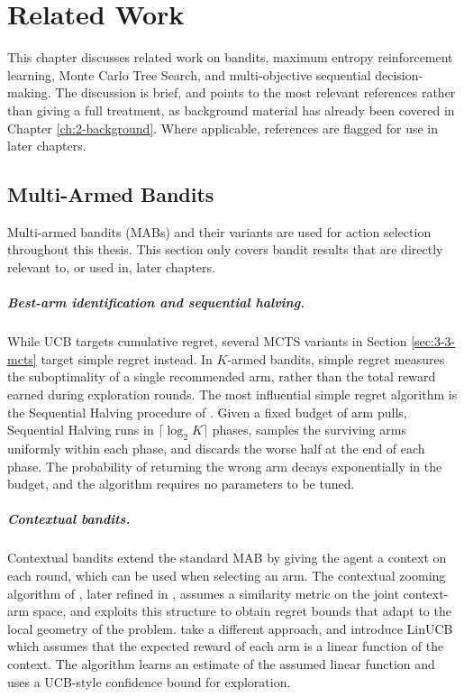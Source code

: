 



\chapter{\label{ch:3-relatedwork}Related Work}

    \minitoc

    This chapter discusses related work on bandits, maximum entropy reinforcement learning, Monte Carlo Tree Search, and multi-objective sequential decision-making. The discussion is brief, and points to the most relevant references rather than giving a full treatment, as background material has already been covered in Chapter \ref{ch:2-background}. Where applicable, references are flagged for use in later chapters.




\section{Multi-Armed Bandits}
\label{sec:3-1-mab}

    Multi-armed bandits (MABs) and their variants are used for action selection throughout this thesis. This section only covers bandit results that are directly relevant to, or used in, later chapters.

    \paragraph{Best-arm identification and sequential halving.}
    While UCB targets cumulative regret, several MCTS variants in Section \ref{sec:3-3-mcts} target simple regret instead. In $K$-armed bandits, simple regret measures the suboptimality of a single recommended arm, rather than the total reward earned during exploration rounds. The most influential simple regret algorithm is the Sequential Halving procedure of \citet{seq_halving}. Given a fixed budget of arm pulls, Sequential Halving runs in $\lceil \log_2 K \rceil$ phases, samples the surviving arms uniformly within each phase, and discards the worse half at the end of each phase. The probability of returning the wrong arm decays exponentially in the budget, and the algorithm requires no parameters to be tuned. 

    \paragraph{Contextual bandits.}
    Contextual bandits extend the standard MAB by giving the agent a context on each round, which can be used when selecting an arm. The contextual zooming algorithm of \citet{cz}, later refined in \cite{cz_long}, assumes a similarity metric on the joint context-arm space, and exploits this structure to obtain regret bounds that adapt to the local geometry of the problem. \citet{linucb} take a different approach, and introduce LinUCB which assumes that the expected reward of each arm is a linear function of the context. The algorithm learns an estimate of the assumed linear function and uses a UCB-style confidence bound for exploration.

